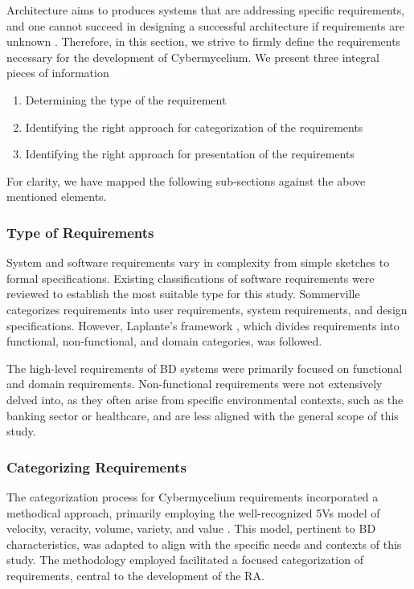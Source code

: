 \documentclass[review]{elsarticle}
\begin{document}
Architecture aims to produces systems that are addressing specific requirements, and one cannot succeed in designing a successful architecture if requirements are unknown \cite{SoftwareArchitectureKazman}. Therefore, in this section, we strive to firmly define the requirements necessary for the development of Cybermycelium. We present three integral pieces of information

\begin{enumerate}
    \item Determining the type of the requirement 
    \item Identifying the right approach for categorization of the requirements 
    \item Identifying the right approach for presentation of the requirements 
\end{enumerate}

For clarity, we have mapped the following sub-sections against the above mentioned elements. 


\subsubsection{Type of Requirements}

System and software requirements vary in complexity from simple sketches to formal specifications. Existing classifications of software requirements were reviewed to establish the most suitable type for this study. Sommerville \cite{sommerville2011software} categorizes requirements into user requirements, system requirements, and design specifications. However, Laplante's framework \cite{laplante2017requirements}, which divides requirements into functional, non-functional, and domain categories, was followed.

The high-level requirements of BD systems were primarily focused on functional and domain requirements. Non-functional requirements were not extensively delved into, as they often arise from specific environmental contexts, such as the banking sector or healthcare, and are less aligned with the general scope of this study.

\subsubsection{Categorizing Requirements}

The categorization process for Cybermycelium requirements incorporated a methodical approach, primarily employing the well-recognized 5Vs model of velocity, veracity, volume, variety, and value \cite{Bughin2016, rad2017big}. This model, pertinent to BD characteristics, was adapted to align with the specific needs and contexts of this study. The methodology employed facilitated a focused categorization of requirements, central to the development of the RA.
\end{document}
